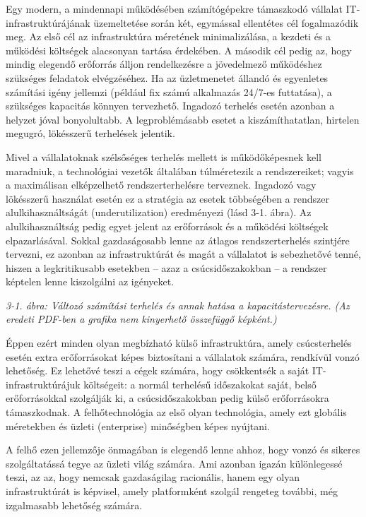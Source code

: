 \documentclass[
]{article}
\begin{document}
Egy modern, a mindennapi működésében számítógépekre támaszkodó vállalat
IT-infrastruktúrájának üzemeltetése során két, egymással ellentétes cél
fogalmazódik meg. Az első cél az infrastruktúra méretének
minimalizálása, a kezdeti és a működési költségek alacsonyan tartása
érdekében. A második cél pedig az, hogy mindig elegendő erőforrás álljon
rendelkezésre a jövedelmező működéshez szükséges feladatok elvégzéséhez.
Ha az üzletmenetet állandó és egyenletes számítási igény jellemzi
(például fix számú alkalmazás 24/7-es futtatása), a szükséges kapacitás
könnyen tervezhető. Ingadozó terhelés esetén azonban a helyzet jóval
bonyolultabb. A legproblémásabb esetet a kiszámíthatatlan, hirtelen
megugró, lökésszerű terhelések jelentik.

Mivel a vállalatoknak szélsőséges terhelés mellett is működőképesnek
kell maradniuk, a technológiai vezetők általában túlméretezik a
rendszereiket; vagyis a maximálisan elképzelhető rendszerterhelésre
terveznek. Ingadozó vagy lökésszerű használat esetén ez a stratégia az
esetek többségében a rendszer alulkihasználtságát (underutilization)
eredményezi (lásd 3-1. ábra). Az alulkihasználtság pedig egyet jelent az
erőforrások és a működési költségek elpazarlásával. Sokkal gazdaságosabb
lenne az átlagos rendszerterhelés szintjére tervezni, ez azonban az
infrastruktúrát és magát a vállalatot is sebezhetővé tenné, hiszen a
legkritikusabb esetekben -- azaz a csúcsidőszakokban -- a rendszer
képtelen lenne kiszolgálni az igényeket.

\emph{3-1. ábra: Változó számítási terhelés és annak hatása a
kapacitástervezésre. (Az eredeti PDF-ben a grafika nem kinyerhető
összefüggő képként.)}

Éppen ezért minden olyan megbízható külső infrastruktúra, amely
csúcsterhelés esetén extra erőforrásokat képes biztosítani a vállalatok
számára, rendkívül vonzó lehetőség. Ez lehetővé teszi a cégek számára,
hogy csökkentsék a saját IT-infrastruktúrájuk költségeit: a normál
terhelésű időszakokat saját, belső erőforrásokkal szolgálják ki, a
csúcsidőszakokban pedig külső erőforrásokra támaszkodnak. A
felhőtechnológia az első olyan technológia, amely ezt globális
méretekben és üzleti (enterprise) minőségben képes nyújtani.

A felhő ezen jellemzője önmagában is elegendő lenne ahhoz, hogy vonzó és
sikeres szolgáltatássá tegye az üzleti világ számára. Ami azonban igazán
különlegessé teszi, az az, hogy nemcsak gazdaságilag racionális, hanem
egy olyan infrastruktúrát is képvisel, amely platformként szolgál
rengeteg további, még izgalmasabb lehetőség számára.
\end{document}
